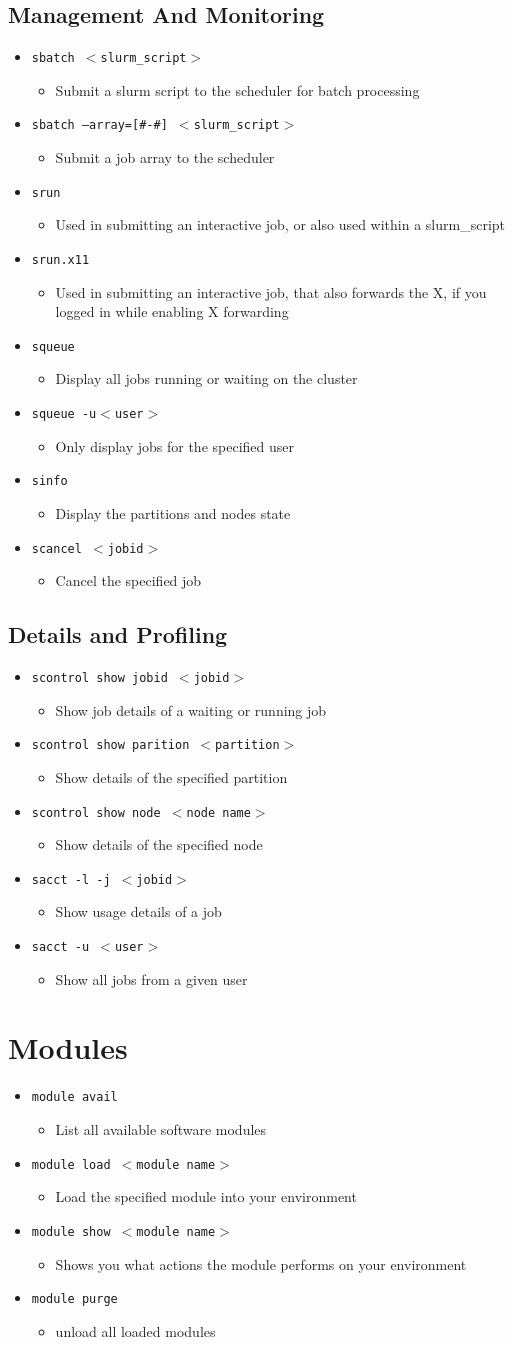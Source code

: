 \documentclass[11pt,twocolumn]{article}
\newcommand{\lft}{$<$}
\newcommand{\rht}{$>$}
\newcommand{\pth}[1]{{\lft}#1{\rht}}
\newcommand{\desc}[1]{\small \begin{itemize}\item[]#1\end{itemize}}
\begin{document}
\subsection{Management And Monitoring}
\begin{itemize}
\item[] \texttt{sbatch \pth{slurm\_script}}\desc{Submit a slurm script to the scheduler for batch processing}
\item[] \texttt{sbatch~--array=[\#-\#]~\pth{slurm\_script}}\desc{Submit a job array to the scheduler}
\item[] \texttt{srun} \desc{Used in submitting an interactive job, or also  used within a slurm\_script}
\item[] \texttt{srun.x11} \desc{Used in submitting an interactive job, that also forwards the X, if you logged in while enabling X forwarding}
\item[] \texttt{squeue} \desc{Display all jobs running or waiting on the cluster}
\item[] \texttt{squeue -u{\lft}user{\rht}} \desc{Only display jobs for the specified user}
\item[]\texttt{sinfo} \desc{Display the partitions and nodes state}
\item[] \texttt{scancel {\lft}jobid{\rht}} \desc{Cancel the specified job}
\end{itemize}

\subsection{Details and Profiling}
\begin{itemize}
\item[] \texttt{scontrol show jobid {\lft}jobid{\rht}}\desc{Show job details of a waiting or running job}
\item[] \texttt{scontrol show parition {\lft}partition{\rht}}\desc{Show details of the specified partition}
\item[] \texttt{scontrol show node {\lft}node name{\rht}}\desc{Show details of the specified node}
\item[] \texttt{sacct -l -j {\lft}jobid{\rht}}\desc{Show usage details of a job}
\item[] \texttt{sacct -u {\lft}user{\rht}}\desc{Show all jobs from a given user}
\end{itemize}

\section{Modules}
\begin{itemize}
\item[] \texttt{module avail} \desc{List all available software modules}
\item[] \texttt{module load \pth{module name}} \desc{Load the specified module into your environment}
\item[] \texttt{module show \pth{module name}} \desc{Shows you what actions the module performs on your environment}
\item[] \texttt{module purge} \desc{unload all loaded modules}
\end{itemize}
\end{document}
